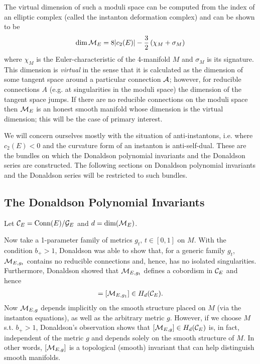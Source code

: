\documentclass[12pt, onecolumn]{article}
\newenvironment{definition}[1][Definition]{\begin{trivlist}
\item[\hskip \labelsep {\bfseries #1}]}{\end{trivlist}}
\newenvironment{remark}[1][Remark]{\begin{trivlist}
\item[\hskip \labelsep {\bfseries #1}]}{\end{trivlist}}
\begin{document}
\vspace{5mm}

\noindent The virtual dimension of such a moduli space can be computed from the index of an elliptic complex (called the instanton deformation complex) and can be shown to be
\begin{align}
\dim{\cal M}_{E} = 8|c_{2}(E)|-\frac{3}{2}\left(\chi_{M}+\sigma_{M}\right)
\label{eqn_virtdim}
\end{align}
where $\chi_{M}$ is the Euler-characteristic of the 4-manifold $M$ and $\sigma_{M}$ is its signature.  This dimension is \textit{virtual} in the sense that it is calculated as the dimension of some tangent space around a particular connection ${\cal A}$; however, for reducible connections $A$ (e.g. at singularities in the moduli space) the dimension of the tangent space jumps.  If there are no reducible connections on the moduli space then ${\cal M}_{E}$ is an honest smooth manifold whose dimension is the virtual dimension; this will be the case of primary interest.

\begin{remark}
We will concern ourselves mostly with the situation of anti-instantons, i.e. where $c_{2}(E)<0$ and the curvature form of an instanton is anti-self-dual.  These are the bundles on which the Donaldson polynomial invariants and the Donaldson series are constructed.  The following sections on Donaldson polynomial invariants and the Donaldson series will be restricted to such bundles.
\end{remark}

\subsection{The Donaldson Polynomial Invariants}
\label{sec_DonaldsonPoly}
\begin{definition}
Let ${\cal C}_{E}=\text{Conn}(E)/{\cal G}_{E}$ and $d=\text{dim}({\cal M}_{E})$.
\end{definition}
Now take a 1-parameter family of metrics $g_{t},\,t \in [0,1]$ on $M$.  With the condition $b_{+}>1$, Donaldson was able to show that, for a generic family $g_{t}$, ${\cal M}_{E,g_{t}}$ contains no reducible connections and, hence, has no isolated singularities.  Furthermore, Donaldson showed that ${\cal M}_{E,g_{t}}$ defines a cobordism in ${\cal C}_{E}$ and hence
\begin{align*}
[{\cal M}_{E,g_{0}}]=[{\cal M}_{E,g_{1}}] \in H_{d}({\cal C}_{E}).
\end{align*}
Now ${\cal M}_{E,g}$ depends implicitly on the smooth structure placed on $M$ (via the instanton equations), as well as the arbitrary metric $g$.  However, if we choose $M$ s.t. $b_{+}>1$, Donaldson's observation shows that $[{\cal M}_{E,g}] \in H_{d}({\cal C}_{E})$ is, in fact, independent of the metric $g$ and depends solely on the smooth structure of $M$.  In other words, $[{\cal M}_{E,g}]$ is a topological (smooth) invariant that can help distinguish smooth manifolds.
\end{document}
